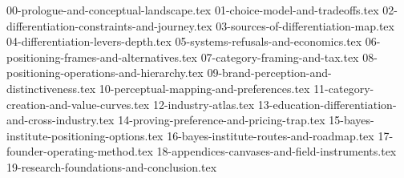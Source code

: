 
{00-prologue-and-conceptual-landscape.tex}
{01-choice-model-and-tradeoffs.tex}
{02-differentiation-constraints-and-journey.tex}
{03-sources-of-differentiation-map.tex}
{04-differentiation-levers-depth.tex}
{05-systems-refusals-and-economics.tex}
{06-positioning-frames-and-alternatives.tex}
{07-category-framing-and-tax.tex}
{08-positioning-operations-and-hierarchy.tex}
{09-brand-perception-and-distinctiveness.tex}
{10-perceptual-mapping-and-preferences.tex}
{11-category-creation-and-value-curves.tex}
{12-industry-atlas.tex}
{13-education-differentiation-and-cross-industry.tex}
{14-proving-preference-and-pricing-trap.tex}
{15-bayes-institute-positioning-options.tex}
{16-bayes-institute-routes-and-roadmap.tex}
{17-founder-operating-method.tex}
{18-appendices-canvases-and-field-instruments.tex}
{19-research-foundations-and-conclusion.tex}
